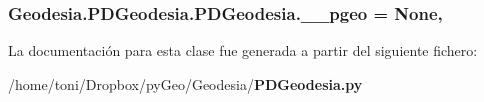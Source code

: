 \subsubsection[{\-\_\-\-\_\-pgeo}]{\setlength{\rightskip}{0pt plus 5cm}Geodesia.\-P\-D\-Geodesia.\-P\-D\-Geodesia.\-\_\-\-\_\-pgeo = None\hspace{0.3cm}{\ttfamily [static]}, {\ttfamily [private]}}\label{classGeodesia_1_1PDGeodesia_1_1PDGeodesia_ac609d54975dde73655b1977a0b095d29}


La documentación para esta clase fue generada a partir del siguiente fichero\-:\begin{DoxyCompactItemize}
\item 
/home/toni/\-Dropbox/py\-Geo/\-Geodesia/{\bf P\-D\-Geodesia.\-py}\end{DoxyCompactItemize}
